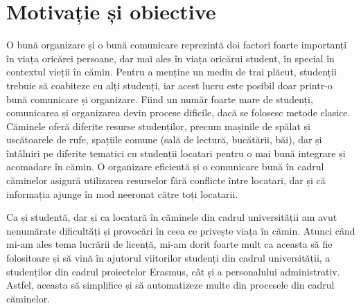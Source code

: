 \documentclass[12pt,a4paper]{report}
\theoremstyle{definition}
\theoremstyle{remark}
\begin{document}
\section{Motivație și obiective}
\par O bună organizare și o bună comunicare reprezintă doi factori foarte importanți în viața oricărei persoane, dar mai ales în viața oricărui student, în special în contextul vieții în cămin. Pentru a menține un mediu de trai plăcut, studenții trebuie să coabiteze cu alți studenți, iar acest lucru este posibil doar printr-o bună comunicare și organizare. Fiind un număr foarte mare de studenți, comunicarea și organizarea devin procese dificile, dacă se folosesc metode clasice. Căminele oferă diferite resurse studenților, precum mașinile de spălat și uscătoarele de rufe, spațiile comune (sală de lectură, bucătării, băi), dar și întâlniri pe diferite tematici cu studenții locatari pentru o mai bună integrare și acomadare în cămin. O organizare eficientă și o comunicare bună în cadrul căminelor asigură  utilizarea resurselor fără conflicte între locatari, dar și că informația ajunge în mod neeronat către toți locatarii.

\par Ca și studentă, dar și ca locatară în căminele din cadrul universității am avut nenumărate dificultăți și provocări în ceea ce privește viața în cămin. Atunci când mi-am ales tema lucrării de licență, mi-am dorit foarte mult ca aceasta să fie folositoare și să vină în ajutorul viitorilor studenți din cadrul universității, a studenților din cadrul proiectelor Erasmus, cât și a personalului administrativ. Astfel, aceasta să simplifice și să automatizeze multe din procesele din cadrul căminelor.
\end{document}

